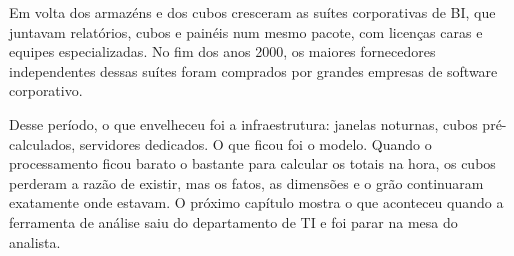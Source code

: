 Em volta dos armazéns e dos cubos cresceram as suítes corporativas de BI, que
juntavam relatórios, cubos e painéis num mesmo pacote, com licenças caras e equipes
especializadas. No fim dos anos 2000, os maiores fornecedores independentes dessas
suítes foram comprados por grandes empresas de software corporativo.

Desse período, o que envelheceu foi a infraestrutura: janelas noturnas, cubos
pré-calculados, servidores dedicados. O que ficou foi o modelo. Quando o processamento
ficou barato o bastante para calcular os totais na hora, os cubos perderam a razão de
existir, mas os fatos, as dimensões e o grão continuaram exatamente onde estavam. O
próximo capítulo mostra o que aconteceu quando a ferramenta de análise saiu do
departamento de TI e foi parar na mesa do analista.

\begin{leituras}
\end{leituras}
